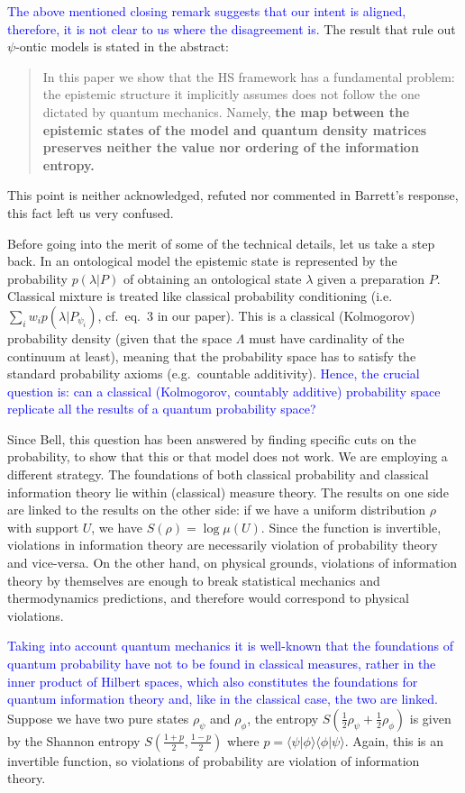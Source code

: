 \documentclass[11pt]{article}
\def\>{\rangle}
\def\<{\langle}
\begin{document}
		\textcolor{blue}{The above mentioned closing remark suggests that our intent is aligned, therefore, it is not clear to us where the disagreement is.} The result that rule out $\psi$-ontic models is stated in the abstract:
\begin{quote}
In this paper we show that the HS framework has a fundamental problem: the epistemic structure it implicitly assumes does not follow the one dictated by quantum mechanics. Namely, \textbf{the map between the epistemic states of the model and quantum density matrices preserves neither the value nor ordering of the information entropy.}
\end{quote}
\noindent This point is neither acknowledged, refuted nor commented in Barrett's response, this fact left us very confused.
	
	Before going into the merit of some of the technical details, let us take a step back. In an ontological model the epistemic state is represented by the probability $p(\lambda | P)$ of obtaining an ontological state $\lambda$ given a preparation $P$. Classical mixture is treated like classical probability conditioning (i.e. $\sum_i  w_i p(\lambda| P_{\psi_i})$, cf.\ eq.~3 in our paper). This is a classical (Kolmogorov) probability density (given that the space $\Lambda$ must have cardinality of the continuum at least), meaning that the probability space has to satisfy the standard probability axioms (e.g.\ countable additivity). \textcolor{blue}{Hence, the crucial question is: can a classical (Kolmogorov, countably additive) probability space replicate all the results of a quantum probability space?}
	
	Since Bell, this question has been answered by finding specific cuts on the probability, to show that this or that model does not work. We are employing a different strategy. The foundations of both classical probability and classical information theory lie within (classical) measure theory. The results on one side are linked to the results on the other side: if we have a uniform distribution $\rho$ with support $U$, we have $S(\rho) = \log \mu(U)$. Since the function is invertible, violations in information theory are necessarily violation of probability theory and vice-versa. On the other hand, on physical grounds, violations of information theory by themselves are enough to break statistical mechanics and thermodynamics predictions, and therefore would correspond to physical violations.
	
	\textcolor{blue}{Taking into account quantum mechanics it is well-known that the foundations of quantum probability have not to be found in classical measures, rather in the inner product of Hilbert spaces, which also constitutes the foundations for quantum information theory and, like in the classical case, the two are linked.} Suppose we have two pure states $\rho_\psi$ and $\rho_\phi$, the entropy $S(\frac{1}{2} \rho_\psi + \frac{1}{2} \rho_\phi)$ is given by the Shannon entropy $S(\frac{1+p}{2}, \frac{1-p}{2})$ where $p=\<\psi | \phi \>\<\phi | \psi\>$. Again, this is an invertible function, so violations of probability are violation of information theory.
	
\end{document}
